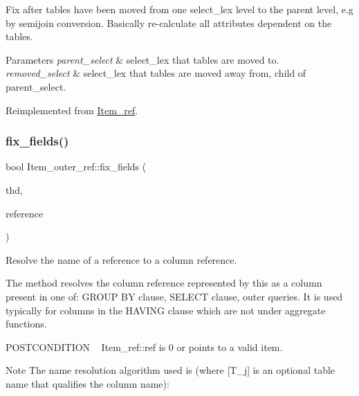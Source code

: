 Fix after tables have been moved from one select\+\_\+lex level to the parent level, e.\+g by semijoin conversion. Basically re-\/calculate all attributes dependent on the tables.


\begin{DoxyParams}{Parameters}
{\em parent\+\_\+select} & select\+\_\+lex that tables are moved to. \\
\hline
{\em removed\+\_\+select} & select\+\_\+lex that tables are moved away from, child of parent\+\_\+select. \\
\hline
\end{DoxyParams}


Reimplemented from \mbox{\hyperlink{classItem__ref_a54fdde8c2418171d5f529e24d733f357}{Item\+\_\+ref}}.

\mbox{\label{classItem__outer__ref_afa87a075b4924dc80749a8e02605d196}} 
\subsubsection{\texorpdfstring{fix\+\_\+fields()}{fix\_fields()}}
{\footnotesize\ttfamily bool Item\+\_\+outer\+\_\+ref\+::fix\+\_\+fields (\begin{DoxyParamCaption}\item[{T\+HD $\ast$}]{thd,  }\item[{\mbox{\hyperlink{classItem}{Item}} $\ast$$\ast$}]{reference }\end{DoxyParamCaption})\hspace{0.3cm}{\ttfamily [virtual]}}

Resolve the name of a reference to a column reference.

The method resolves the column reference represented by \textquotesingle{}this\textquotesingle{} as a column present in one of\+: G\+R\+O\+UP BY clause, S\+E\+L\+E\+CT clause, outer queries. It is used typically for columns in the H\+A\+V\+I\+NG clause which are not under aggregate functions.

P\+O\+S\+T\+C\+O\+N\+D\+I\+T\+I\+ON ~\newline
Item\+\_\+ref\+::ref is 0 or points to a valid item.

\begin{DoxyNote}{Note}
The name resolution algorithm used is (where \mbox{[}T\+\_\+j\mbox{]} is an optional table name that qualifies the column name)\+:
\end{DoxyNote}


